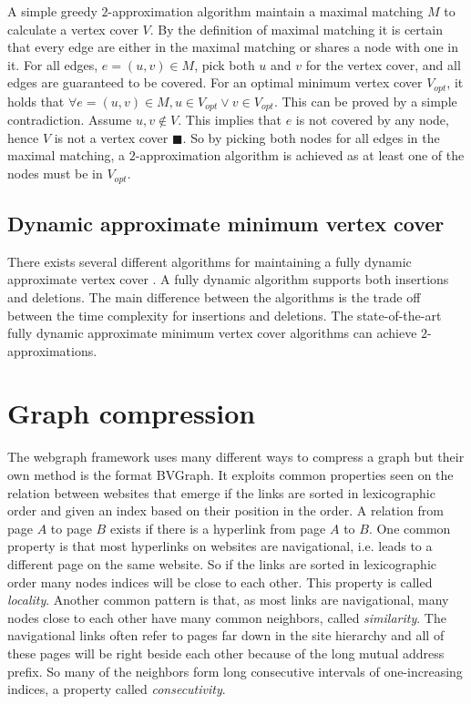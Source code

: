 A simple greedy $2$-approximation algorithm maintain a maximal matching $M$ to calculate a vertex cover $V$. By the definition of maximal matching it is certain that every edge are either in the maximal matching or shares a node with one in it. For all edges, $e = (u,v) \in M$, pick both $u$ and $v$ for the vertex cover, and all edges are guaranteed to be covered. For an optimal minimum vertex cover $V_{opt}$, it holds that $\forall e = (u,v) \in M, u \in V_{opt} \vee v \in V_{opt}$. This can be proved by a simple contradiction. Assume $u,v \notin V$. This implies that $e$ is not covered by any node, hence $V$ is not a vertex cover $\blacksquare$. So by picking both nodes for all edges in the maximal matching, a $2$-approximation algorithm is achieved as at least one of the nodes must be in $V_{opt}$.

\subsection{Dynamic approximate minimum vertex cover}
There exists several different algorithms for maintaining a fully dynamic approximate vertex cover \cite{2appdynvc, 2appdynvclogn, 2eappdynvc}. A fully dynamic algorithm supports both insertions and deletions. The main difference between the algorithms is the trade off between the time complexity for insertions and deletions. The state-of-the-art fully dynamic approximate minimum vertex cover algorithms can achieve $2$-approximations.


\section{Graph compression}
\label{sec:Compression}

The webgraph framework\cite{webgraph} uses many different ways to compress a graph but their own method is the format BVGraph. It exploits common properties seen on the relation between websites that emerge if the links are sorted in lexicographic order and given an index based on their position in the order. A relation from page $A$ to page $B$ exists if there is a hyperlink from page $A$ to $B$. One common property is that most hyperlinks on websites are navigational, i.e. leads to a different page on the same website. So if the links are sorted in lexicographic order many nodes indices will be close to each other. This property is called \emph{locality}. Another common pattern is that, as most links are navigational, many nodes close to each other have many common neighbors, called \emph{similarity}. The navigational links often refer to pages far down in the site hierarchy and all of these pages will be right beside each other because of the long mutual address prefix. So many of the neighbors form long consecutive intervals of one-increasing indices, a property called \emph{consecutivity}. \cite{webgraph-compression}

